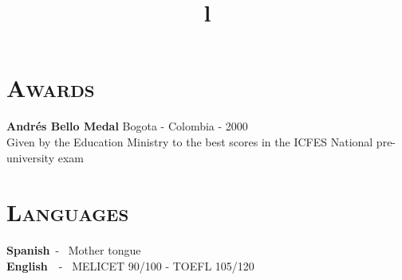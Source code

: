 \begin{resume}

\section{\textsc{Awards}}
\textbf{Andr\'{e}s Bello Medal} \hfill          Bogota - Colombia - 2000 \\
Given by the Education Ministry to the best scores in the ICFES National pre-university exam \hfill \\

\section{\textsc{Languages}}
\textbf{Spanish}\   - \  Mother tongue \\
\textbf{English}\ \  - \  MELICET 90/100 - TOEFL 105/120


\begin{formatb}
  \title{l}\\
 \\
  \body\\
\end{formatb}


\end{resume}
